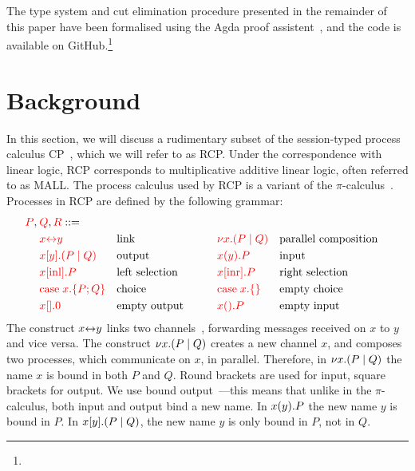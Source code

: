 \documentclass[a4paper,UKenglish]{lipics-v2016}
\begin{document}
The type system and cut elimination procedure presented in the remainder of this
paper have been formalised using the Agda proof assistent~\cite{norell2009}, and
the code is available on GitHub.\footnote{
}

\section{Background}
In this section, we will discuss a rudimentary subset of the session-typed
process calculus CP~\cite{wadler2012}, which we will refer to as RCP.
Under the correspondence with linear logic, RCP corresponds to multiplicative
additive linear logic, often referred to as MALL.
The process calculus used by RCP is a variant of the
$\pi$-calculus~\cite{milner1992b}. Processes in RCP are defined by
the following grammar:
\[
  \begin{aligned}
    \red{P},\:&\red{Q},\red{R} ::=\\
    &       \red{\link{x}{y}}           &&\text{link}
    &\qquad&\red{\cut{x}(P \mid Q)}     &&\text{parallel composition}\\
    &       \red{\send{x}{y}(P \mid Q)} &&\text{output}
    &\qquad&\red{\recv{x}{y}P}          &&\text{input}\\
    &       \red{\inl{x}P}              &&\text{left selection}
    &\qquad&\red{\inr{x}P}              &&\text{right selection}\\
    &       \red{\case{x}{P}{Q}}        &&\text{choice}
    &\qquad&\red{\case{x}{}{}}          &&\text{empty choice}\\
    &       \red{\send{x}{}0}           &&\text{empty output}
    &\qquad&\red{\recv{x}{}P}           &&\text{empty input}\\
  \end{aligned}
\]
The construct ${x{\leftrightarrow}y}$ links two channels~\cite{sangiorgi1996,boreale1998},
forwarding messages received on $x$ to $y$ and vice versa.
%
The construct ${\nu x.}{(P \mid Q)}$ creates a new channel $x$, and composes two
processes, which communicate on $x$, in parallel.
Therefore, in ${\nu x.}{(P \mid Q)}$ the name $x$ is bound in both $P$ and $Q$.
%
Round brackets are used for input, square brackets for output.
We use bound output~\cite{sangiorgi1996}---this means that unlike in the
$\pi$-calculus, both input and output bind a new name.
In ${x(y).}P$ the new name $y$ is bound in $P$.
In ${x[y].}{(P \mid Q)}$, the new name $y$ is only bound in $P$, not in $Q$.
\end{document}

